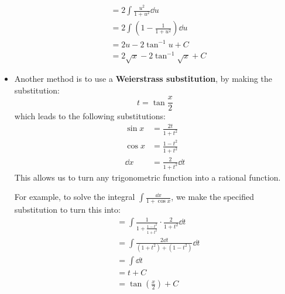\begin{itemize}
\begin{align}
        &= 2\int \frac{u^2}{1+u^2} \dd{u} \\ 
        &= 2 \int \left(1 - \frac{1}{1+u^2}\right) \dd{u} \\ 
        &= 2u -2\tan^{-1}u + C \\ 
        &= 2\sqrt{x} - 2\tan^{-1}\sqrt{x} + C
    \end{align}
    \item Another method is to use a \textbf{Weierstrass substitution}, by making the substitution:
    \begin{equation}
        t = \tan \frac{x}{2}
    \end{equation}
    which leads to the following substitutions:
    \begin{align}
        \sin x &= \frac{2t}{1+t^2} \\ 
        \cos x &= \frac{1-t^2}{1+t^2} \\ 
        \dd{x} &= \frac{2}{1+t^2} \dd{t}
    \end{align}
    This allows us to turn any trigonometric function into a rational function.
    \begin{example}
        For example, to solve the integral $\int \frac{\dd{x}}{1+\cos x}$, we make the specified substitution to turn this into:
        \begin{align}
            &= \int \frac{1}{1+\frac{1-t^2}{1+t^2}} \cdot \frac{2}{1+t^2} \dd{t} \\ 
            &= \int \frac{2 \dd{t}}{(1+t^2)+(1-t^2)} \dd{t} \\ 
            &= \int \dd{t} \\ 
            &= t + C \\ 
            &= \tan\left(\frac{x}{2}\right) + C
        \end{align}
    \end{example}
\end{itemize}